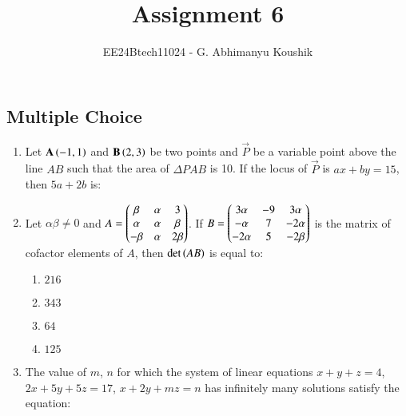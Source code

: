 \documentclass[journal,12pt,onecolumn]{IEEEtran}
\theoremstyle{remark}
\begin{document}
\title{Assignment 6}
\author{EE24Btech11024 - G. Abhimanyu Koushik}
\maketitle
\renewcommand{\thefigure}{\theenumi}
\renewcommand{\thetable}{\theenumi}
\subsection{Multiple Choice}
\begin{enumerate}

\item Let $\mathbf{A}\left(-1,1\right)$ and $\mathbf{B}\left(2,3\right)$ be two points and $\vec{P}$ be a variable point above the line $AB$ such that the area of $\Delta PAB$ is 10. If the locus of $\vec{P}$ is $ax+by=15$, then $5a+2b$ is:

\hfill{}
\begin{enumerate}
\end{enumerate}

\item Let $\alpha\beta\neq 0$ and $A=\begin{pmatrix}\beta & \alpha & 3\\\alpha & \alpha & \beta\\-\beta & \alpha & 2\beta\end{pmatrix}$. If $B=\begin{pmatrix}3\alpha & -9 & 3\alpha\\-\alpha & 7 & -2\alpha \\ -2\alpha & 5 & -2\beta\end{pmatrix}$ is the matrix of cofactor elements of $A$, then $\det\left(AB\right)$ is equal to:

\hfill{}
\begin{enumerate}
\item $216$
\item $343$
\item $64$
\item $125$
\end{enumerate}

\item The value of $m$, $n$ for which the system of linear equations \newline $x+y+z=4$, \newline $2x+5y+5z=17$, \newline $x+2y+mz=n$ \newline has infinitely many solutions satisfy the equation:


\end{enumerate}
\end{document}
